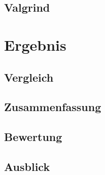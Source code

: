 \documentclass[a4paper]{scrartcl}
\begin{document}
\subsection{Valgrind}\label{ch:Valgrind}

\section{Ergebnis}\label{ch:Ergebnis}
\subsection{Vergleich}\label{ch:Vergleich}
\subsection{Zusammenfassung}\label{ch:Zusammenfassung}
\subsection{Bewertung}\label{ch:Bewertung}
\subsection{Ausblick}\label{ch:Ausblick}
\end{document}
